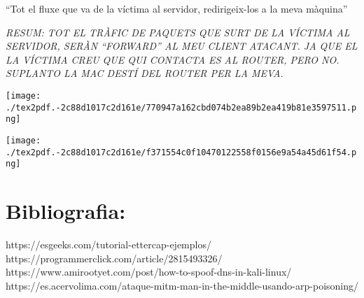 \documentclass[]{article}
\begin{document}
``Tot el fluxe que va de la víctima al servidor, redirigeix-los a la
meva màquina''

\emph{RESUM: TOT EL TRÀFIC DE PAQUETS QUE SURT DE LA VÍCTIMA AL
SERVIDOR, SERÀN ``FORWARD'' AL MEU CLIENT ATACANT. JA QUE EL LA VÍCTIMA
CREU QUE QUI CONTACTA ES AL ROUTER, PERO NO. SUPLANTO LA MAC DESTÍ DEL
ROUTER PER LA MEVA.}

\texttt{[image: ./tex2pdf.-2c88d1017c2d161e/770947a162cbd074b2ea89b2ea419b81e3597511.png]}

\texttt{[image: ./tex2pdf.-2c88d1017c2d161e/f371554c0f10470122558f0156e9a54a45d61f54.png]}

\hypertarget{bibliografia}{%
\section{\texorpdfstring{\textbf{Bibliografia}:}{Bibliografia:}}\label{bibliografia}}

https://esgeeks.com/tutorial-ettercap-ejemplos/
https://programmerclick.com/article/2815493326/
https://www.amirootyet.com/post/how-to-spoof-dns-in-kali-linux/
https://es.acervolima.com/ataque-mitm-man-in-the-middle-usando-arp-poisoning/
\end{document}
